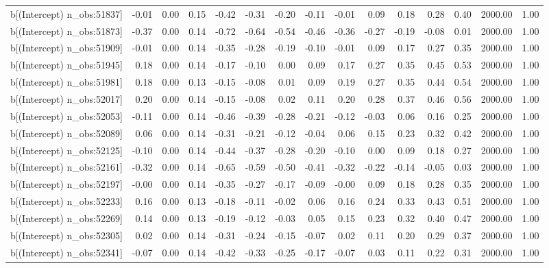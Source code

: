 \begin{table}[ht]
\begin{tabular}{rrrrrrrrrrrrrrr}
  b[(Intercept) n\_obs:51837] & -0.01 & 0.00 & 0.15 & -0.42 & -0.31 & -0.20 & -0.11 & -0.01 & 0.09 & 0.18 & 0.28 & 0.40 & 2000.00 & 1.00 \\ 
  b[(Intercept) n\_obs:51873] & -0.37 & 0.00 & 0.14 & -0.72 & -0.64 & -0.54 & -0.46 & -0.36 & -0.27 & -0.19 & -0.08 & 0.01 & 2000.00 & 1.00 \\ 
  b[(Intercept) n\_obs:51909] & -0.01 & 0.00 & 0.14 & -0.35 & -0.28 & -0.19 & -0.10 & -0.01 & 0.09 & 0.17 & 0.27 & 0.35 & 2000.00 & 1.00 \\ 
  b[(Intercept) n\_obs:51945] & 0.18 & 0.00 & 0.14 & -0.17 & -0.10 & 0.00 & 0.09 & 0.17 & 0.27 & 0.35 & 0.45 & 0.53 & 2000.00 & 1.00 \\ 
  b[(Intercept) n\_obs:51981] & 0.18 & 0.00 & 0.13 & -0.15 & -0.08 & 0.01 & 0.09 & 0.19 & 0.27 & 0.35 & 0.44 & 0.54 & 2000.00 & 1.00 \\ 
  b[(Intercept) n\_obs:52017] & 0.20 & 0.00 & 0.14 & -0.15 & -0.08 & 0.02 & 0.11 & 0.20 & 0.28 & 0.37 & 0.46 & 0.56 & 2000.00 & 1.00 \\ 
  b[(Intercept) n\_obs:52053] & -0.11 & 0.00 & 0.14 & -0.46 & -0.39 & -0.28 & -0.21 & -0.12 & -0.03 & 0.06 & 0.16 & 0.25 & 2000.00 & 1.00 \\ 
  b[(Intercept) n\_obs:52089] & 0.06 & 0.00 & 0.14 & -0.31 & -0.21 & -0.12 & -0.04 & 0.06 & 0.15 & 0.23 & 0.32 & 0.42 & 2000.00 & 1.00 \\ 
  b[(Intercept) n\_obs:52125] & -0.10 & 0.00 & 0.14 & -0.44 & -0.37 & -0.28 & -0.20 & -0.10 & 0.00 & 0.09 & 0.18 & 0.27 & 2000.00 & 1.00 \\ 
  b[(Intercept) n\_obs:52161] & -0.32 & 0.00 & 0.14 & -0.65 & -0.59 & -0.50 & -0.41 & -0.32 & -0.22 & -0.14 & -0.05 & 0.03 & 2000.00 & 1.00 \\ 
  b[(Intercept) n\_obs:52197] & -0.00 & 0.00 & 0.14 & -0.35 & -0.27 & -0.17 & -0.09 & -0.00 & 0.09 & 0.18 & 0.28 & 0.35 & 2000.00 & 1.00 \\ 
  b[(Intercept) n\_obs:52233] & 0.16 & 0.00 & 0.13 & -0.18 & -0.11 & -0.02 & 0.06 & 0.16 & 0.24 & 0.33 & 0.43 & 0.51 & 2000.00 & 1.00 \\ 
  b[(Intercept) n\_obs:52269] & 0.14 & 0.00 & 0.13 & -0.19 & -0.12 & -0.03 & 0.05 & 0.15 & 0.23 & 0.32 & 0.40 & 0.47 & 2000.00 & 1.00 \\ 
  b[(Intercept) n\_obs:52305] & 0.02 & 0.00 & 0.14 & -0.31 & -0.24 & -0.15 & -0.07 & 0.02 & 0.11 & 0.20 & 0.29 & 0.37 & 2000.00 & 1.00 \\ 
  b[(Intercept) n\_obs:52341] & -0.07 & 0.00 & 0.14 & -0.42 & -0.33 & -0.25 & -0.17 & -0.07 & 0.03 & 0.11 & 0.22 & 0.31 & 2000.00 & 1.00 \\ 

\end{tabular}
\end{table}
